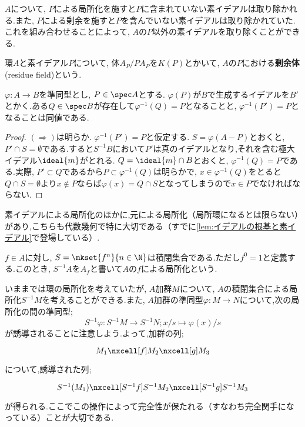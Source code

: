 $A$について, $P$による局所化を施すと$P$に含まれていない素イデアルは取り除かれる.また, $P$による剰余を施すと$P$を含んでいない素イデアルは取り除かれていた.これを組み合わせることによって, $A$の$P$以外の素イデアルを取り除くことができる.
\begin{defi}[剰余体]\label{defi:剰余体}
	環$A$と素イデアル$P$について, 体$A_P/PA_P$を$K(P)$とかいて, $A$の$P$における\textbf{剰余体}(residue field)という.
\end{defi}

\begin{prop}\label{prop:上にイデアルがあることの同値条件}
	$\varphi:A\to B$を準同型とし, $P\in\spec A$とする. $\varphi(P)$が$B$で生成するイデアルを$B'$とかく.ある$Q\in\spec B$が存在して$\varphi^{-1}(Q)=P$となることと, $\varphi^{-1}(P')=P$となることは同値である.
\end{prop}

\begin{proof}
	$(\Longrightarrow)$は明らか. $\varphi^{-1}(P')=P$と仮定する. $S=\varphi(A-P)$とおくと, $P'\cap S=\emptyset$である.すると$S^{-1}B$において$P'$は真のイデアルとなり,それを含む極大イデアル$\ideal{m}$がとれる. $Q=\ideal{m}\cap B$とおくと, $\varphi^{-1}(Q)=P$である.実際, $P'\subset Q$であるから$P\subset\varphi^{-1}(Q)$は明らかで, $x\in\varphi^{-1}(Q)$をとると$Q\cap S=\emptyset$より$x\not\in P$ならば$\varphi(x)=Q\cap S$となってしまうので$x\in P$でなければならない.
\end{proof}

素イデアルによる局所化のほかに,元による局所化（局所環になるとは限らない）があり,こちらも代数幾何で特に大切である（すでに\ref{lem:イデアルの根基と素イデアル}で登場している）.
\begin{defi}
	$f\in A$に対し, $S=\mkset{f^n}{n\in\N}$は積閉集合である.ただし$f^0=1$と定義する.このとき, $S^{-1}A$を$A_f$と書いて$A$の$f$による局所化という.	
\end{defi}

いままでは環の局所化を考えていたが, $A$加群$M$について, $A$の積閉集合による局所化$S^{-1}M$を考えることができる.また, $A$加群の準同型$\varphi:M\to N$について,次の局所化の間の準同型;
\[S^{-1}\varphi:S^{-1}M\to S^{-1}N;x/s\mapsto \varphi(x)/s\]
が誘導されることに注意しよう.よって,加群の列;
\[\begin{tikzcd}
	M_1\nxcell[f]M_2\nxcell[g]M_3
\end{tikzcd}\]
について,誘導された列;
\[\begin{tikzcd}
S^{-1}(M_1)\nxcell[S^{-1}f]S^{-1}M_2\nxcell[S^{-1}g]S^{-1}M_3
\end{tikzcd}\]
が得られる.ここでこの操作によって完全性が保たれる（すなわち完全関手になっている）ことが大切である.

